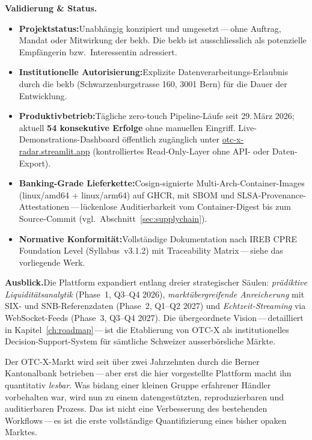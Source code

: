 \documentclass[11pt, a4paper, oneside, openany]{report}
\begin{document}
\noindent\textbf{\sffamily\textcolor{SwissRed}{Validierung \& Status.}}
\begin{itemize}[leftmargin=1.4em, itemsep=2pt, topsep=2pt]
  \item \textbf{Projektstatus:}\;Unabhängig konzipiert und umgesetzt\,---\,ohne Auftrag, Mandat oder Mitwirkung der \gls{bekb}. Die \gls{bekb} ist ausschliesslich als potenzielle Empfängerin bzw.\ Interessentin adressiert.
  \item \textbf{Institutionelle Autorisierung:}\;Explizite Datenverarbeitungs-Erlaubnis durch die \gls{bekb} (Schwarzenburgstrasse 160, 3001 Bern) für die Dauer der Entwicklung.
  \item \textbf{Produktivbetrieb:}\;Tägliche zero-touch Pipeline-Läufe seit 29.\,März 2026; aktuell \textbf{54 konsekutive Erfolge} ohne manuellen Eingriff. Live-Demonstrations-Dashboard öffentlich zugänglich unter \href{https://otc-x-radar.streamlit.app}{otc-x-radar.streamlit.app} (kontrolliertes Read-Only-Layer ohne API- oder Daten-Export).
  \item \textbf{Banking-Grade Lieferkette:}\;Cosign-signierte Multi-Arch-Container-Images (linux/amd64 + linux/arm64) auf GHCR, mit SBOM und SLSA-Provenance-Attestationen\,---\,lückenlose Auditierbarkeit vom Container-Digest bis zum Source-Commit (vgl.~Abschnitt~\ref{sec:supplychain}).
  \item \textbf{Normative Konformität:}\;Vollständige Dokumentation nach IREB CPRE Foundation Level (Syllabus~v3.1.2) mit Traceability Matrix\,---\,siehe das vorliegende Werk.
\end{itemize}

\vspace{0.4cm}

\noindent\textbf{\sffamily\textcolor{SwissRed}{Ausblick.}}\;Die Plattform expandiert entlang dreier strategischer Säulen: \textit{prädiktive Liquiditätsanalytik} (Phase~1, Q3--Q4 2026), \textit{marktübergreifende Anreicherung} mit SIX- und SNB-Referenzdaten (Phase~2, Q1--Q2 2027) und \textit{Echtzeit-Streaming} via WebSocket-Feeds (Phase~3, Q3--Q4 2027). Die übergeordnete Vision\,---\,detailliert in Kapitel~\ref{ch:roadmap}\,---\,ist die Etablierung von OTC-X als institutionelles Decision-Support-System für sämtliche Schweizer ausserbörsliche Märkte.

\vspace{0.55cm}

\begin{insightbox}
Der OTC-X-Markt wird seit über zwei Jahrzehnten durch die Berner Kantonalbank betrieben\,---\,aber erst die hier vorgestellte Plattform macht ihn quantitativ \emph{lesbar}. Was bislang einer kleinen Gruppe erfahrener Händler vorbehalten war, wird nun zu einem datengestützten, reproduzierbaren und auditierbaren Prozess. Das ist nicht eine Verbesserung des bestehenden Workflows\,---\,es ist die erste vollständige Quantifizierung eines bisher opaken Marktes.
\end{insightbox}
\end{document}
